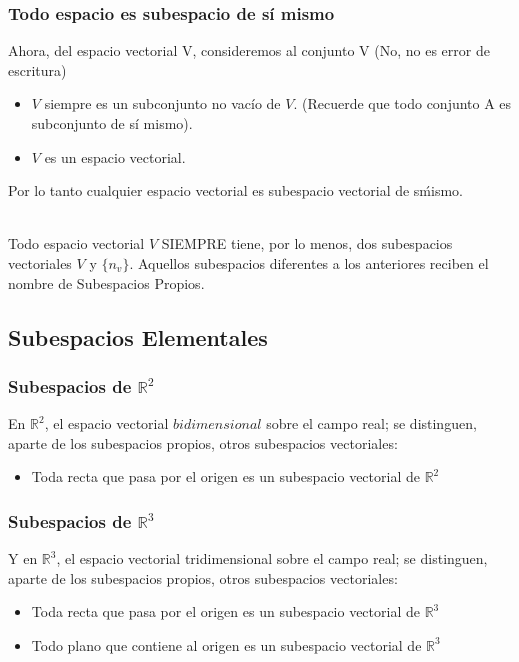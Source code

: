 \subsubsection{Todo espacio es subespacio de sí mismo}
Ahora, del espacio vectorial V, consideremos al conjunto V (No, no es error de escritura)
\begin{itemize}
\item $V$ siempre es un subconjunto no vac\'io de $V$. (Recuerde que todo conjunto A es subconjunto de s\'i mismo).
\item $V$ es un espacio vectorial.
\end{itemize}

Por lo tanto cualquier espacio vectorial es subespacio vectorial de s\' mismo.

~\\
Todo espacio vectorial $V$ SIEMPRE tiene, por lo menos, dos subespacios vectoriales $V$ y $\lbrace n_v\rbrace$. Aquellos subespacios diferentes a los anteriores reciben el nombre de Subespacios Propios.
~\\
\subsection{Subespacios Elementales}
\subsubsection{Subespacios de $\mathbb{R}^2$}
En $\mathbb{R}^2$, el espacio vectorial $bidimensional$ sobre el campo real; se distinguen, aparte de los subespacios propios, otros subespacios vectoriales:


\begin{itemize}
\item Toda recta que pasa por el origen es un subespacio vectorial de $\mathbb{R}^2$

\end{itemize}
\subsubsection{Subespacios de $\mathbb{R}^3$}
Y en $\mathbb{R}^3$, el espacio vectorial tridimensional sobre el campo real; se distinguen, aparte de los subespacios propios, otros subespacios vectoriales:

\begin{itemize}
\item Toda recta que pasa por el origen es un subespacio vectorial de $\mathbb{R}^3$
\item Todo plano que contiene al origen es un subespacio vectorial de $\mathbb{R}^3$
\end{itemize}

